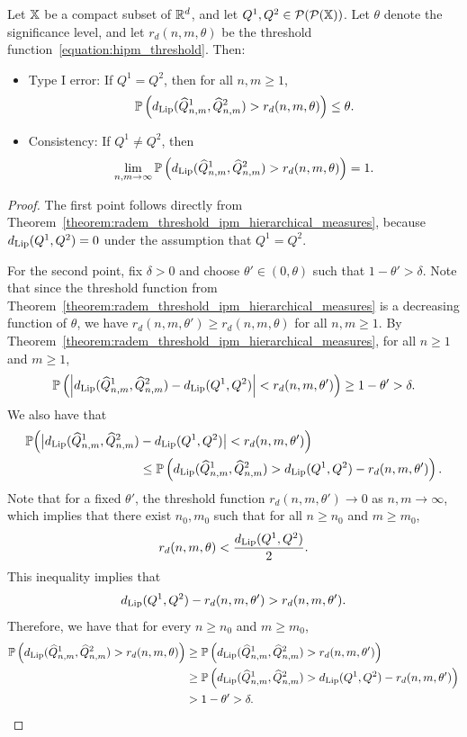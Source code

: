 \begin{theorem}
\label{theorem:radem_consistency_hipm}
Let $\mathbb{X}$ be a compact subset of $\mathbb{R}^d$, and let $Q^1, Q^2 \in \mathcal{P}(\mathcal{P}(\mathbb{X}))$. Let $\theta$ denote the significance level, and let $r_d(n, m, \theta)$ be the threshold function~\eqref{equation:hipm_threshold}. Then:
\begin{itemize}
    \item Type I error: If $Q^1 = Q^2$, then for all $n, m \geq 1$,
    $$\mathbb{P}\left( d_{\mathrm{Lip}}(\widehat{Q}_{n,m}^1, \widehat{Q}_{n,m}^2) > r_d(n,m, \theta) \right) \leq \theta.$$
    \item Consistency: If $Q^1 \neq Q^2$, then  
    $$\lim_{n,m\to \infty}\mathbb{P}\left( d_{\mathrm{Lip}}(\widehat{Q}_{n,m}^1, \widehat{Q}_{n,m}^2) > r_d(n,m, \theta) \right) = 1.$$
\end{itemize}
\end{theorem}
\begin{proof}
The first point follows directly from Theorem~\ref{theorem:radem_threshold_ipm_hierarchical_measures}, because \(d_{\mathrm{Lip}}(Q^1, Q^2) = 0\) under the assumption that \(Q^1 = Q^2.\)

For the second point, fix \(\delta > 0\) and choose \(\theta' \in (0, \theta)\) such that \(1 - \theta' > \delta\). Note that since the threshold function from Theorem~\ref{theorem:radem_threshold_ipm_hierarchical_measures} is a decreasing function of \(\theta\), we have \(r_d(n,m,\theta') \geq r_d(n,m,\theta)\) for all \(n, m \geq 1\). By Theorem~\ref{theorem:radem_threshold_ipm_hierarchical_measures}, for all \(n \geq 1\) and \(m \geq 1\),
\begin{align*}
\mathbb{P}\left( \left|d_{\mathrm{Lip}}(\widehat{Q}^1_{n,m}, \widehat{Q}^2_{n,m}) - d_{\mathrm{Lip}}(Q^1, Q^2) \right| < r_d(n, m, \theta') \right) \geq 1 - \theta' > \delta.
\end{align*}
We also have that 
\begin{align*}
\mathbb{P}\Big(\big|d_{\mathrm{Lip}}(\widehat{Q}^1_{n,m}, \widehat{Q}^2_{n,m}) & - d_{\mathrm{Lip}}(Q^1, Q^2) \big| < r_d(n, m, \theta') \Big) \\
&\leq \mathbb{P}\left( d_{\mathrm{Lip}}(\widehat{Q}^1_{n,m}, \widehat{Q}^2_{n,m}) > d_{\mathrm{Lip}}(Q^1, Q^2) - r_d(n, m, \theta')\right).
\end{align*}
Note that for a fixed \(\theta'\), the threshold function \(r_d(n, m, \theta') \to 0\) as \(n, m \to \infty\), which implies that there exist \(n_0, m_0\) such that for all \(n \geq n_0\) and \(m \geq m_0\),
\[
r_d(n, m, \theta) < \frac{d_{\mathrm{Lip}}(Q^1, Q^2)}{2}. 
\]
This inequality implies that 
\[
d_{\mathrm{Lip}}(Q^1, Q^2) - r_d(n, m, \theta') > r_d(n, m, \theta').
\]
Therefore, we have that for every \(n \geq n_0\) and \(m \geq m_0\), 
\begin{align*}
\mathbb{P}\left( d_{\mathrm{Lip}}(\widehat{Q}^1_{n,m}, \widehat{Q}^2_{n,m}) > r_d(n, m, \theta) \right) & 
\geq \mathbb{P}\left( d_{\mathrm{Lip}}(\widehat{Q}^1_{n,m}, \widehat{Q}^2_{n,m}) > r_d(n, m, \theta') \right)\\
& \geq \mathbb{P}\left( d_{\mathrm{Lip}}(\widehat{Q}^1_{n,m}, \widehat{Q}^2_{n,m}) > d_{\mathrm{Lip}}(Q^1, Q^2) - r_d(n, m, \theta') \right) \\
& > 1- \theta' > \delta.
\end{align*}
\end{proof}

